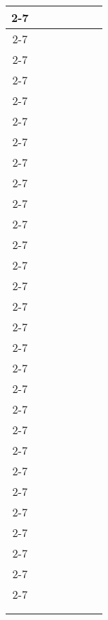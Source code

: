 \documentclass[titlepage,11pt]{article}
\renewcommand{\baselinestretch}{1.48}
\begin{document}
\begin{longtable}[!htbp]{|c|c|c|c|c|c|c|}
	\cline{2-7}  &  &  &  &  &  &  \\ 
	\cline{2-7}  &  &  &  &  &  &  \\ 
	\cline{2-7}  &  &  &  &  &  &  \\ 
	\cline{2-7}  &  &  &  &  &  &  \\ 
	\cline{2-7}  &  &  &  &  &  &  \\ 
	\cline{2-7}  &  &  &  &  &  &  \\ 
	\cline{2-7}  &  &  &  &  &  &  \\ 
	\cline{2-7}  &  &  &  &  &  &  \\ 
	\cline{2-7}  &  &  &  &  &  &  \\ 
	\cline{2-7}  &  &  &  &  &  &  \\ 
	\cline{2-7}  &  &  &  &  &  &  \\ 
	\cline{2-7}  &  &  &  &  &  &  \\ 
	\cline{2-7}  &  &  &  &  &  &  \\ 
	\cline{2-7}  &  &  &  &  &  &  \\ 
	\cline{2-7}  &  &  &  &  &  &  \\ 
	\cline{2-7}  &  &  &  &  &  &  \\ 
	\cline{2-7}  &  &  &  &  &  &  \\ 
	\cline{2-7}  &  &  &  &  &  &  \\ 
	\cline{2-7}  &  &  &  &  &  &  \\ 
	\cline{2-7}  &  &  &  &  &  &  \\ 
	\cline{2-7}  &  &  &  &  &  &  \\ 
	\cline{2-7}  &  &  &  &  &  &  \\ 
	\cline{2-7}  &  &  &  &  &  &  \\ 
	\cline{2-7}  &  &  &  &  &  &  \\ 
	\cline{2-7}  &  &  &  &  &  &  \\ 
	\cline{2-7}  &  &  &  &  &  &  \\ 
	\cline{2-7}  &  &  &  &  &  &  \\ 
	\cline{2-7}  &  &  &  &  &  &  \\ 
	\cline{2-7}  &  &  &  &  &  &  \\ 
	\hline  &  &  &  &  &  &  \\ 
	\hline  &  &  &  &  &  &  \\ 
	\hline 

\end{longtable} 



\newpage
\renewcommand{\baselinestretch}{1}
\small
\normalsize


\end{document}
